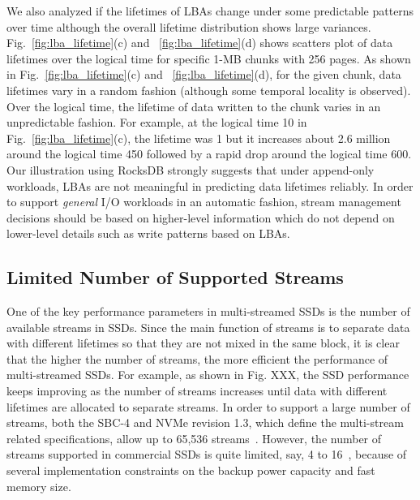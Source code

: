 We also analyzed 
if the lifetimes of LBAs change under some predictable patterns over time 
although the overall lifetime distribution shows large variances.
Fig.~\ref{fig:lba_lifetime}(c) and ~\ref{fig:lba_lifetime}(d) shows
scatters plot of data lifetimes over the logical time 
for specific 1-MB chunks with 256 pages. 
As shown in Fig.~\ref{fig:lba_lifetime}(c) and ~\ref{fig:lba_lifetime}(d), 
for the given chunk, data lifetimes vary in a random fashion
(although some temporal locality is observed).
Over the logical time, the lifetime of data written to the chunk 
varies in an unpredictable fashion.  
For example, at the logical time 10 in Fig.~\ref{fig:lba_lifetime}(c), 
the lifetime was 1 but it increases about 
2.6 million around the logical time 450 
followed by a rapid drop around the logical time 600. 
Our illustration using RocksDB strongly suggests that under append-only workloads, 
LBAs are not meaningful in predicting data lifetimes reliably.
In order to support {\it general} I/O workloads in an automatic fashion, stream 
management decisions should be based on higher-level information
which do not depend on lower-level details such as write patterns based on LBAs.

\subsection{Limited Number of Supported Streams}
One of the key performance parameters in multi-streamed SSDs is the number of 
available streams in SSDs.  
Since the main function of  streams is to separate data with different lifetimes 
so that they are not mixed in the same block, it is clear that the 
higher the number of streams, the more efficient the performance of multi-streamed SSDs.
For example, as shown in Fig. XXX,
the SSD performance keeps improving as the number of streams increases 
until data with different lifetimes are allocated to separate streams.   
In order to support a large number of streams, both the SBC-4 and NVMe revision 1.3, which define the 
multi-stream related specifications, allow up to 65,536 streams~\cite{T10, NVMe}.  
However, the number of streams supported in
commercial SSDs is quite limited, say, 4 to 16~\cite{MultiStream, Level, AutoStream}, 
because of several implementation constraints on the backup power capacity and fast memory size.

